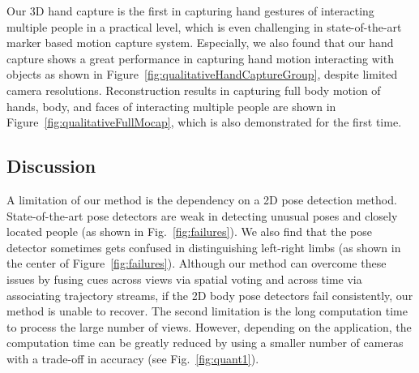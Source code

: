 Our 3D hand capture is the first in capturing hand gestures of interacting multiple people in a practical level, which is even challenging in state-of-the-art marker based motion capture system. Especially, we also found that our hand capture shows a great performance in capturing hand motion interacting with objects as shown in Figure~\ref{fig:qualitativeHandCaptureGroup}, despite limited camera resolutions.  Reconstruction results in capturing full body motion of hands, body, and faces of interacting multiple people are shown in Figure~\ref{fig:qualitativeFullMocap}, which is also demonstrated for the first time. 


\subsection{Discussion}
\label{subsection:Limitation}
A limitation of our method is the dependency on a 2D pose detection method. State-of-the-art pose detectors are weak in detecting unusual poses and closely located people (as shown in  Fig.~\ref{fig:failures}). We also find that the pose detector sometimes gets confused in distinguishing left-right limbs (as shown in the center of Figure~\ref{fig:failures}). Although our method can overcome these issues by fusing cues across views via spatial voting and across time via associating trajectory streams, if the 2D body pose detectors fail consistently, our method is unable to recover. The second limitation is the long computation time to process the large number of views. However, depending on the application, the computation time can be greatly reduced by using a smaller number of cameras with a trade-off in accuracy (see Fig.~\ref{fig:quant1}). 
%
%


